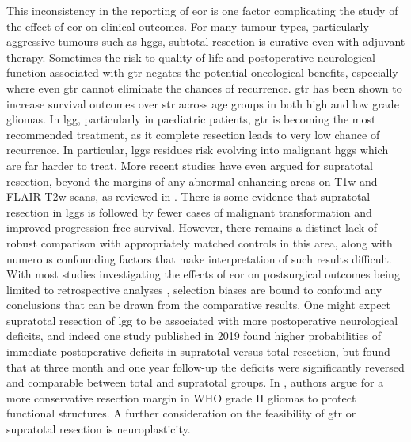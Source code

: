 This inconsistency in the reporting of \gls{eor} is one factor complicating the study of the effect of \gls{eor} on clinical outcomes.
For many tumour types, particularly aggressive tumours such as \glspl{hgg}, subtotal resection is  curative even with adjuvant therapy.
Sometimes the risk to quality of life and postoperative neurological function associated with \gls{gtr} negates the potential oncological benefits, especially where even \gls{gtr} cannot eliminate the chances of recurrence.
\Gls{gtr} has been shown to increase survival outcomes over \gls{str} across age groups in both high\autocite{Hatoum2022, Han2020, Adams2016, McCrea2015, Bloch2012, McGirt2009, Kramm2006} and low grade \autocite{Keles2001, Pollack1995, Sanai2008} gliomas.
In \gls{lgg}, particularly in paediatric patients, \gls{gtr} is becoming the most recommended treatment, as it complete resection leads to very low chance of recurrence.\autocite{Berger1994}
In particular, \glspl{lgg} residues risk evolving into malignant \glspl{hgg} which are far harder to treat.
More recent studies have even argued for supratotal resection, beyond the margins of any abnormal enhancing areas on T1w and FLAIR T2w scans, as reviewed in \textcite{deLeeuw2019}.
There is some evidence \autocite{Yordanova2011} that supratotal resection in \glspl{lgg} is followed by fewer cases of malignant transformation and improved progression-free survival.
However, there remains a distinct lack of robust comparison with appropriately matched controls in this area, along with numerous confounding factors that make interpretation of such results difficult.
With most studies investigating the effects of \gls{eor} on postsurgical outcomes being limited to retrospective analyses , selection biases are bound to confound any conclusions that can be drawn from the comparative results.\autocite{deLeeuw2019,Keles2001}
One might expect supratotal resection of \gls{lgg} to be associated with more postoperative neurological deficits, and indeed one study published in 2019 found higher probabilities of immediate postoperative deficits in supratotal versus total resection, but found that at three month and one year follow-up the deficits were significantly reversed and comparable between total and supratotal groups.\autocite{Rossi2019a}
In \textcite{Gil-Robles2010}, authors argue for a more conservative resection margin in WHO grade II gliomas to protect functional structures.
A further consideration on the feasibility of \gls{gtr} or supratotal resection is neuroplasticity.
